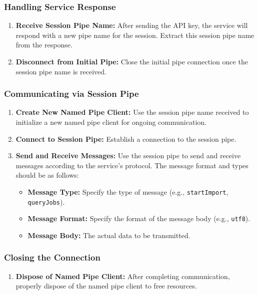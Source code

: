 \documentclass{memoir}
\begin{document}
	\subsubsection{Handling Service Response}
	\begin{enumerate}
		\item \textbf{Receive Session Pipe Name:} After sending the API key, the service will respond with a new pipe name for the session. Extract this session pipe name from the response.
		\item \textbf{Disconnect from Initial Pipe:} Close the initial pipe connection once the session pipe name is received.
	\end{enumerate}
	
	\subsubsection{Communicating via Session Pipe}
	\begin{enumerate}
		\item \textbf{Create New Named Pipe Client:} Use the session pipe name received to initialize a new named pipe client for ongoing communication.
		\item \textbf{Connect to Session Pipe:} Establish a connection to the session pipe.
		\item \textbf{Send and Receive Messages:} Use the session pipe to send and receive messages according to the service's protocol. The message format and types should be as follows:
		\begin{itemize}
			\item \textbf{Message Type:} Specify the type of message (e.g., \texttt{startImport}, \texttt{queryJobs}).
			\item \textbf{Message Format:} Specify the format of the message body (e.g., \texttt{utf8}).
			\item \textbf{Message Body:} The actual data to be transmitted.
		\end{itemize}
	\end{enumerate}
	
	\subsubsection{Closing the Connection}
	\begin{enumerate}
		\item \textbf{Dispose of Named Pipe Client:} After completing communication, properly dispose of the named pipe client to free resources.
	\end{enumerate}
	
\end{document}
